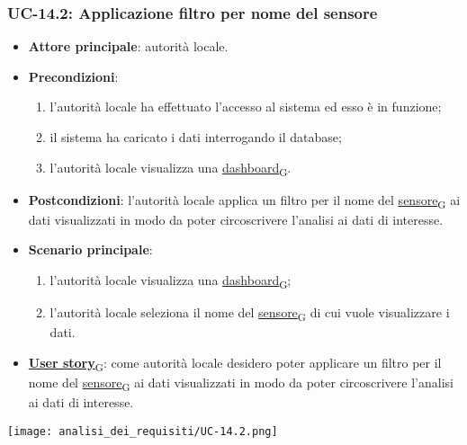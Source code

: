 \newpage

\subsubsection{UC-14.2: Applicazione filtro per nome del sensore}
\begin{itemize}
	\item \textbf{Attore principale}: autorità locale.
	\item \textbf{Precondizioni}:
	      \begin{enumerate}
		      \item l'autorità locale ha effettuato l'accesso al sistema ed esso è in funzione;
		      \item il sistema ha caricato i dati interrogando il database;
		      \item l'autorità locale visualizza una \href{https://7last.github.io/docs/rtb/documentazione-interna/glossario\#dashboard}{dashboard\textsubscript{G}}.
	      \end{enumerate}
	\item \textbf{Postcondizioni}: l'autorità locale applica un filtro per il nome del \href{https://7last.github.io/docs/rtb/documentazione-interna/glossario\#sensore}{sensore\textsubscript{G}} ai dati visualizzati in modo da poter circoscrivere l'analisi ai dati di interesse.
	\item \textbf{Scenario principale}:
	      \begin{enumerate}
		      \item l'autorità locale visualizza una \href{https://7last.github.io/docs/rtb/documentazione-interna/glossario\#dashboard}{dashboard\textsubscript{G}};
		      \item l'autorità locale seleziona il nome del \href{https://7last.github.io/docs/rtb/documentazione-interna/glossario\#sensore}{sensore\textsubscript{G}} di cui vuole visualizzare i dati.
	      \end{enumerate}
	\item \href{https://7last.github.io/docs/rtb/documentazione-interna/glossario\#user-story}{\textbf{User story}\textsubscript{G}}:
	      come autorità locale desidero poter applicare un filtro per il nome del \href{https://7last.github.io/docs/rtb/documentazione-interna/glossario\#sensore}{sensore\textsubscript{G}} ai dati visualizzati in modo da poter circoscrivere l'analisi ai dati di interesse.
\end{itemize}
\begin{center}
	\texttt{[image: analisi\_dei\_requisiti/UC-14.2.png]}
\end{center}

